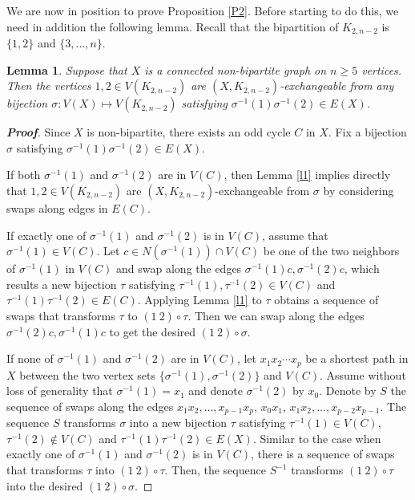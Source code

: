 \documentclass[11pt]{article}
\newtheorem{lem}[thm]{Lemma}%
\begin{document}
 We are now in position to prove Proposition \ref{P2}. Before starting to do this, we
 need in addition the following lemma. Recall that the bipartition of $K_{2,n-2}$ is  $\{1, 2\}$ and $\{3,\dots,n\}$.
\begin{lem}\label{l2}
 Suppose that $X$ is a connected non-bipartite graph on $n\ge 5$ vertices. Then the vertices $1, 2\in V(K_{2,n-2})$ are $(X, K_{2,n-2})$-exchangeable from any bijection $\sigma:V(X)\mapsto V(K_{2,n-2})$ satisfying $\sigma^{-1}(1)\sigma^{-1}(2)\in E(X)$. 
\end{lem}
\begin{proof}[\bfseries{Proof}] Since $X$ is non-bipartite, there exists an odd cycle $C$ in $X$. 
Fix a bijection $\sigma$ satisfying $\sigma^{-1}(1)\sigma^{-1}(2)\in E(X)$. 

If both $\sigma^{-1}(1)$ and $\sigma^{-1}(2)$ are in $V(C)$, then  Lemma \ref{l1} implies directly that $1,2 \in V(K_{2,n-2})$ are $(X, K_{2,n-2})$-exchangeable from $\sigma$ by considering swaps along edges in $E(C)$.

If exactly one of $\sigma^{-1}(1)$ and $\sigma^{-1}(2)$ is in $V(C)$, assume  that $\sigma^{-1}(1)\in V(C)$. Let $c\in N(\sigma^{-1}(1))\cap V(C)$ be one of the two neighbors of $\sigma^{-1}(1)$ in $V(C)$ and swap along the edges $\sigma^{-1}(1)c, \sigma^{-1}(2)c$, which results a new bijection $\tau$ satisfying $\tau^{-1}(1),\tau^{-1}(2)\in V(C)$ and $\tau^{-1}(1) \tau^{-1}(2)\in E(C)$. Applying Lemma \ref{l1} to $\tau$ obtains a sequence of swaps that transforms $\tau$ to $(1 \ 2)\circ \tau$. Then we can swap along the edges $\sigma^{-1}(2)c, \sigma^{-1}(1)c$ to get the desired $(1 \ 2)\circ \sigma$.

If none of $\sigma^{-1}(1)$ and $\sigma^{-1}(2)$ are  in $V(C)$, let $x_1x_2\cdots x_p$ be a shortest path in $X$ between the two vertex sets $\{\sigma^{-1}(1),\sigma^{-1}(2)\}$ and $V(C)$. Assume without loss of generality that $\sigma^{-1}(1)=x_1$ and denote $\sigma^{-1}(2)$ by $x_0$. Denote  by $S$ the sequence of swaps  along the edges $x_1x_2,\dots, x_{p-1}x_p$, $x_0 x_1$, $x_1x_2,\dots, x_{p-2}x_{p-1}$. The sequence $S$ transforms $\sigma$ into a new bijection $\tau$ satisfying $\tau^{-1}(1)\in V(C)$, $\tau^{-1}(2)\notin V(C)$ and $\tau^{-1}(1)\tau^{-1}(2)\in E(X)$. Similar to the case when  exactly one of $\sigma^{-1}(1)$ and $\sigma^{-1}(2)$ is in $V(C)$, there is a sequence of swaps that transforms $\tau$ into $(1 \ 2)\circ \tau$. Then, the sequence  $S^{-1}$ transforms $(1 \ 2)\circ \tau$ into the desired $(1 \ 2)\circ \sigma$.
\end{proof}
\end{document}
